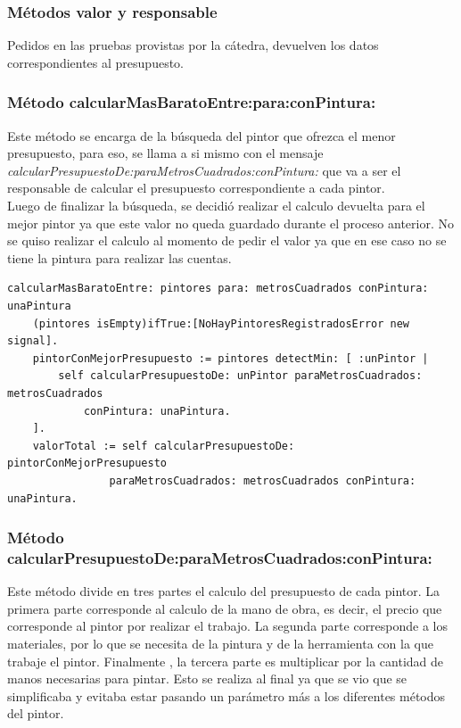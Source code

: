 \documentclass[titlepage,a4paper]{article}
\begin{document}
\subsubsection*{Métodos valor y responsable}
\indent Pedidos en las pruebas provistas por la cátedra, devuelven los datos correspondientes al presupuesto.

\medskip

\subsubsection*{Método calcularMasBaratoEntre:para:conPintura:}
\indent Este método se encarga de la búsqueda del pintor que ofrezca el menor presupuesto, para eso, se llama a si mismo con el mensaje \textit{calcularPresupuestoDe:paraMetrosCuadrados:conPintura:} que va a ser el responsable de calcular el presupuesto correspondiente a cada pintor. \\
\indent Luego de finalizar la búsqueda, se decidió realizar el calculo devuelta para el mejor pintor ya que este valor no queda guardado durante el proceso anterior. No se quiso realizar el calculo al momento de pedir el valor ya que en ese caso no se tiene la pintura para realizar las cuentas.

\begin{verbatim}
calcularMasBaratoEntre: pintores para: metrosCuadrados conPintura: unaPintura
    (pintores isEmpty)ifTrue:[NoHayPintoresRegistradosError new signal].
    pintorConMejorPresupuesto := pintores detectMin: [ :unPintor | 
        self calcularPresupuestoDe: unPintor paraMetrosCuadrados: metrosCuadrados 
            conPintura: unaPintura.
    ].
    valorTotal := self calcularPresupuestoDe: pintorConMejorPresupuesto 
                paraMetrosCuadrados: metrosCuadrados conPintura: unaPintura.
\end{verbatim}

\subsubsection*{Método calcularPresupuestoDe:paraMetrosCuadrados:conPintura:}
\indent Este método divide en tres partes el calculo del presupuesto de cada pintor.
La primera parte corresponde al calculo de la mano de obra, es decir, el precio que corresponde al pintor por realizar el trabajo. La segunda parte corresponde a los materiales, por lo que se necesita de la pintura y de la herramienta con la que trabaje el pintor. Finalmente , la tercera parte es multiplicar por la cantidad de manos necesarias para pintar. Esto se realiza al final ya que se vio que se simplificaba y evitaba estar pasando un parámetro más a los diferentes métodos del pintor.
\end{document}
